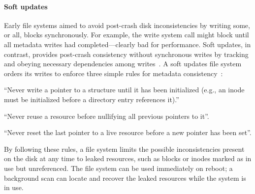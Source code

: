\paragraph{Soft updates}
%
Early file systems aimed to avoid post-crash disk inconsistencies by
 writing some, or all, blocks synchronously.
%
For example, the write system call might block until all metadata writes
 had completed---clearly bad for performance.
%
Soft updates, in contrast, provides post-crash consistency without
 synchronous writes by tracking and obeying necessary dependencies among
 writes~\cite{ganger00soft}.
%
A soft updates file system orders its writes to enforce three simple rules
 for metadata consistency~\cite{ganger00soft}:

\begin{compactenumerate}
\item \label{rule:pointer} ``Never write a pointer to a structure until it
 has been initialized (e.g., an inode must be initialized before a
 directory entry references it).''
\item \label{rule:reuse} ``Never reuse a resource before nullifying all
 previous pointers to it''.
\item \label{rule:overwrite} ``Never reset the last pointer to a live
 resource before a new pointer has been set''.
\end{compactenumerate}

\noindent
By following these rules, a file system limits the possible inconsistencies
present on the disk at any time to leaked resources, such as blocks or inodes
marked as in use but unreferenced. The file system can be used immediately
 on reboot; a background scan can locate and recover the leaked resources
 while the system is in use.

